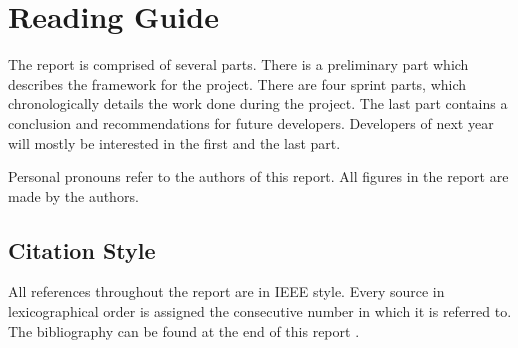 \chapter*{Reading Guide}
The report is comprised of several parts. There is a preliminary part which describes the framework for the project. There are four sprint parts, which chronologically details the work done during the project. The last part contains a conclusion and recommendations for future developers. Developers of next year will mostly be interested in the first and the last part.

Personal pronouns refer to the authors of this report. All figures in the report are made by the authors.

\section*{Citation Style}
All references throughout the report are in IEEE style. Every source in lexicographical order is assigned the consecutive number in which it is referred to. The bibliography can be found at the end of this report .


